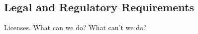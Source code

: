 \documentclass[10pt]{article}
\begin{document}

    \subsection{Legal and Regulatory Requirements}
    Licenses. What can we do? What can't we do?

%
%
\end{document}
